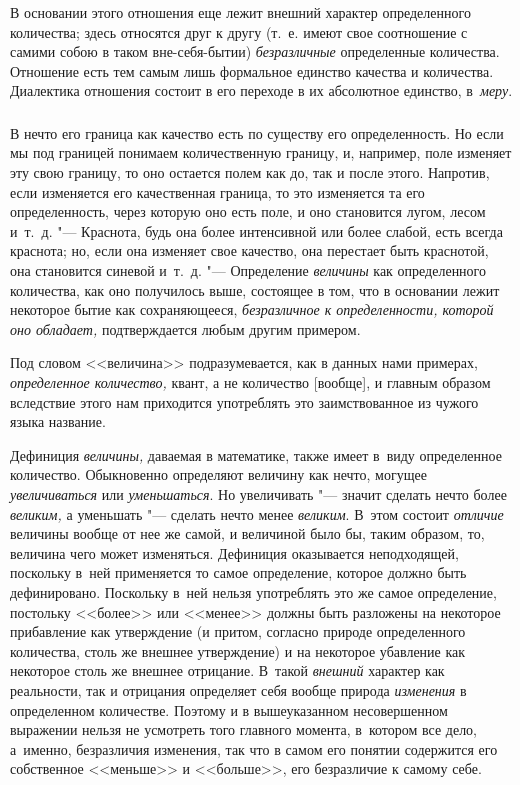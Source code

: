 В основании этого отношения еще лежит внешний характер определенного
количества; здесь относятся друг к другу (т.~е. имеют свое соотношение
с самими собою в таком вне-себя-бытии) {\em безразличные} определенные
количества. Отношение есть тем самым лишь формальное единство качества
и количества. Диалектика отношения состоит в его переходе в их абсолютное
единство, в~{\em меру}.

\subsubsection[Примечание]{}

В нечто его граница как качество есть по существу его определенность. Но если
мы под границей понимаем количественную границу, и, например, поле изменяет эту
свою границу, то оно остается полем как до, так и после этого. Напротив, если
изменяется его качественная граница, то это изменяется та его определенность,
через которую оно есть поле, и оно становится лугом, лесом и~т.~д. "---
Краснота, будь она более интенсивной или более слабой, есть всегда краснота;
но, если она изменяет свое качество, она перестает быть краснотой, она
становится синевой и~т.~д. "--- Определение {\em величины} как определенного
количества, как оно получилось выше, состоящее в том, что в основании лежит
некоторое бытие как сохраняющееся, {\em безразличное к определенности, которой
оно обладает,} подтверждается любым другим примером.

Под словом <<величина>> подразумевается, как в данных нами примерах,
{\em определенное количество,} квант, а не количество [вообще], и главным
образом вследствие этого нам приходится употреблять это заимствованное из
чужого языка название.

Дефиниция {\em величины,} даваемая в математике, также имеет в~виду
определенное количество. Обыкновенно определяют величину как нечто, могущее
{\em увеличиваться} или {\em уменьшаться}. Но увеличивать "--- значит сделать
нечто более {\em великим,} а уменьшать "--- сделать нечто менее {\em великим}.
В~этом состоит {\em отличие} величины вообще от нее же самой, и величиной было
бы, таким образом, то, величина чего может изменяться. Дефиниция оказывается
неподходящей, поскольку в~ней применяется то самое определение, которое должно
быть дефинировано. Поскольку в~ней нельзя употреблять это же самое определение,
постольку <<более>> или <<менее>> должны быть разложены на некоторое
прибавление как утверждение (и притом, согласно природе определенного
количества, столь же внешнее утверждение) и на некоторое убавление как
некоторое столь же внешнее отрицание. В~такой {\em внешний} характер как
реальности, так и отрицания определяет себя вообще природа {\em изменения}
в определенном количестве. Поэтому и в вышеуказанном несовершенном выражении
нельзя не усмотреть того главного момента, в~котором все дело, а~именно,
безразличия изменения, так что в самом его понятии содержится его собственное
<<меньше>> и <<больше>>, его безразличие к самому себе.

